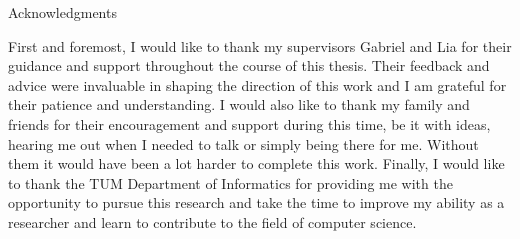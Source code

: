 \thispagestyle{empty}

\vspace*{20mm}

\begin{center}
    { Acknowledgments}
\end{center}

\vspace{10mm}

First and foremost, I would like to thank my supervisors Gabriel and Lia for their guidance and support throughout the course of this thesis. 
Their feedback and advice were invaluable in shaping the direction of this work and I am grateful for their patience and understanding. 
I would also like to thank my family and friends for their encouragement and support during this time, be it with ideas, 
hearing me out when I needed to talk or simply being there for me. Without them it would have been a lot harder to complete this work.
Finally, I would like to thank the TUM Department of Informatics for providing me with the opportunity to pursue this research and take the time
to improve my ability as a researcher and learn to contribute to the field of computer science.

\cleardoublepage{}
